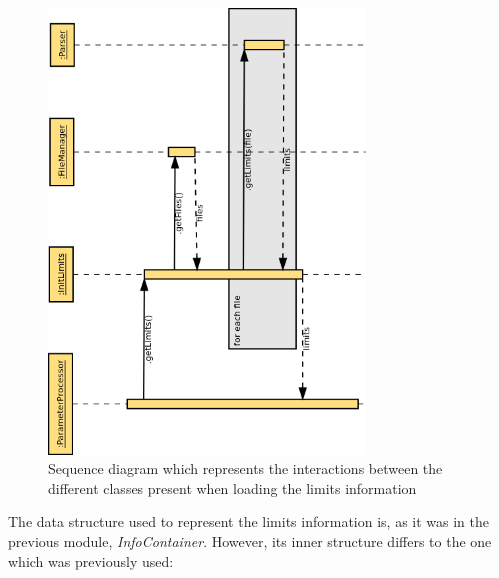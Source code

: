 \begin{figure}[H]
\centerline{\includegraphics[width=0.75\textwidth]{images/InitLimitsSequence.png}}
\caption{Sequence diagram which represents the interactions between the different classes present when loading the limits information}
\label{f5.9}
\end{figure}
\pagebreak
The data structure used to represent the limits information is, as it was in the previous module, \emph{InfoContainer}. However, its inner structure differs to the one which was previously used:

